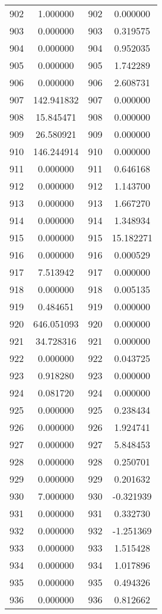\documentclass[12pt]{article}
\begin{document}
\begin{longtable}{@{}cccc@{}}
902 & 1.000000 & 902 & 0.000000 \\
903 & 0.000000 & 903 & 0.319575 \\
904 & 0.000000 & 904 & 0.952035 \\
905 & 0.000000 & 905 & 1.742289 \\
906 & 0.000000 & 906 & 2.608731 \\
907 & 142.941832 & 907 & 0.000000 \\
908 & 15.845471 & 908 & 0.000000 \\
909 & 26.580921 & 909 & 0.000000 \\
910 & 146.244914 & 910 & 0.000000 \\
911 & 0.000000 & 911 & 0.646168 \\
912 & 0.000000 & 912 & 1.143700 \\
913 & 0.000000 & 913 & 1.667270 \\
914 & 0.000000 & 914 & 1.348934 \\
915 & 0.000000 & 915 & 15.182271 \\
916 & 0.000000 & 916 & 0.000529 \\
917 & 7.513942 & 917 & 0.000000 \\
918 & 0.000000 & 918 & 0.005135 \\
919 & 0.484651 & 919 & 0.000000 \\
920 & 646.051093 & 920 & 0.000000 \\
921 & 34.728316 & 921 & 0.000000 \\
922 & 0.000000 & 922 & 0.043725 \\
923 & 0.918280 & 923 & 0.000000 \\
924 & 0.081720 & 924 & 0.000000 \\
925 & 0.000000 & 925 & 0.238434 \\
926 & 0.000000 & 926 & 1.924741 \\
927 & 0.000000 & 927 & 5.848453 \\
928 & 0.000000 & 928 & 0.250701 \\
929 & 0.000000 & 929 & 0.201632 \\
930 & 7.000000 & 930 & -0.321939 \\
931 & 0.000000 & 931 & 0.332730 \\
932 & 0.000000 & 932 & -1.251369 \\
933 & 0.000000 & 933 & 1.515428 \\
934 & 0.000000 & 934 & 1.017896 \\
935 & 0.000000 & 935 & 0.494326 \\
936 & 0.000000 & 936 & 0.812662 \\

\end{longtable}
\end{document}
